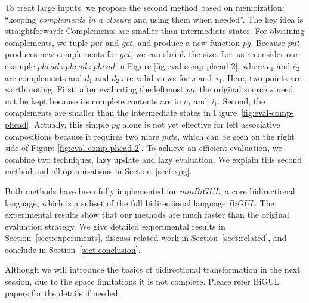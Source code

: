 To treat large inputs, we propose the second method based on memoization: ``keeping \emph{complements in a closure} and using them when needed''. The key idea is straightforward: Complements are smaller
than
intermediate states.
%
%
For obtaining complements, we tuple $put$ and $get$, and produce a new function $pg$. Because $put$ produces new complements for $get$, we can shrink the size.
Let us reconsider our example $phead \circ phead \circ phead$ in Figure \ref{fig:eval-comp-phead-2}, where $c_1$ and $c_2$ are complements and $d_1$ and $d_2$ are valid views for $s$ and~$i_1$. Here, two points are worth noting. First, after evaluating the leftmost $pg$, the original source $s$ need not be kept because its complete contents are in $c_1$ and~$i_1$. Second, the complements are smaller than the intermediate states in Figure~\ref{fig:eval-comp-phead}.
Actually, this simple
$pg$ alone is not yet effective for left associative compositions because it requires two more $put$s, which can be seen on the right side of Figure \ref{fig:eval-comp-phead-2}. To achieve an efficient evaluation, we combine two techniques, lazy update and lazy evaluation. We explain this second method and all optimizations in Section~\ref{sect:xpg}.

Both methods have been fully implemented for \emph{minBiGUL}, a core bidirectional language, which is a subset of the full bidirectional language \emph{BiGUL}. The experimental results show that our methods are much faster than the original evaluation strategy.
We give detailed experimental results in Section~\ref{sect:experiments}, discuss related work in Section~\ref{sect:related}, and conclude in Section~\ref{sect:conclusion}.

Although we will introduce the basics of bidirectional transformation in the next session, due to the space limitations it is not complete. Please refer BiGUL papers \cite{Ko:2016:BFV:2847538.2847544, Ko:2017:ABB:3177123.3158129} for the details if needed.

